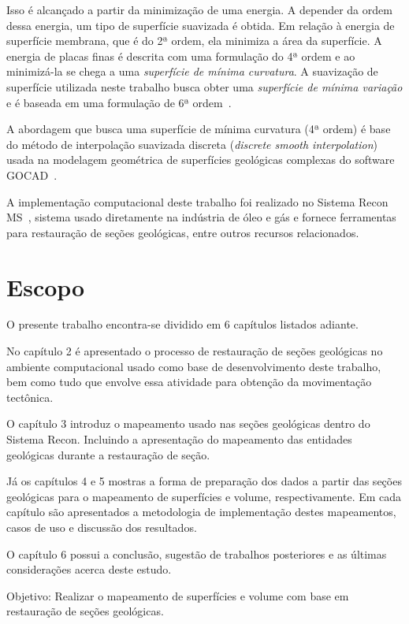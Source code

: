 Isso é alcançado a partir da minimização de uma energia. A depender da ordem dessa energia, um tipo de superfície suavizada é obtida. Em relação à energia de superfície membrana, que é do 2ª ordem, ela minimiza a área da superfície. A energia de placas finas é descrita com uma formulação do 4ª ordem e ao minimizá-la se chega a uma \emph{superfície de mínima curvatura}. A suavização de superfície utilizada neste trabalho busca obter uma \emph{superfície de mínima variação} e é baseada em uma formulação de 6ª ordem~\cite{Botsch}.

A abordagem que busca uma superfície de mínima curvatura (4ª ordem) é base do método de interpolação suavizada discreta (\emph{discrete smooth interpolation})~\cite{DSI} usada na modelagem geométrica de superfícies geológicas complexas do software GOCAD~\cite{GOCAD}.

A implementação computacional deste trabalho foi realizado no Sistema Recon MS~\cite{ReconTecgraf}, sistema usado diretamente na indústria de óleo e gás e fornece ferramentas para restauração de seções geológicas, entre outros recursos relacionados.

\section{Escopo}

O presente trabalho encontra-se dividido em 6 capítulos listados adiante.

No capítulo 2 é apresentado o processo de restauração de seções geológicas no ambiente computacional usado como base de desenvolvimento deste trabalho, bem como tudo que envolve essa atividade para obtenção da movimentação tectônica.

O capítulo 3 introduz o mapeamento usado nas seções geológicas dentro do Sistema Recon. Incluindo a apresentação do mapeamento das entidades geológicas durante a restauração de seção.

Já os capítulos 4 e 5 mostras a forma de preparação dos dados a partir das seções geológicas para o mapeamento de superfícies e volume, respectivamente. Em cada capítulo são apresentados a metodologia de implementação destes mapeamentos, casos de uso e discussão dos resultados.

O capítulo 6 possui a conclusão, sugestão de trabalhos posteriores e as últimas considerações acerca deste estudo.


\iffalse

Objetivo: Realizar o mapeamento de superfícies e volume com base em restauração de seções geológicas.

